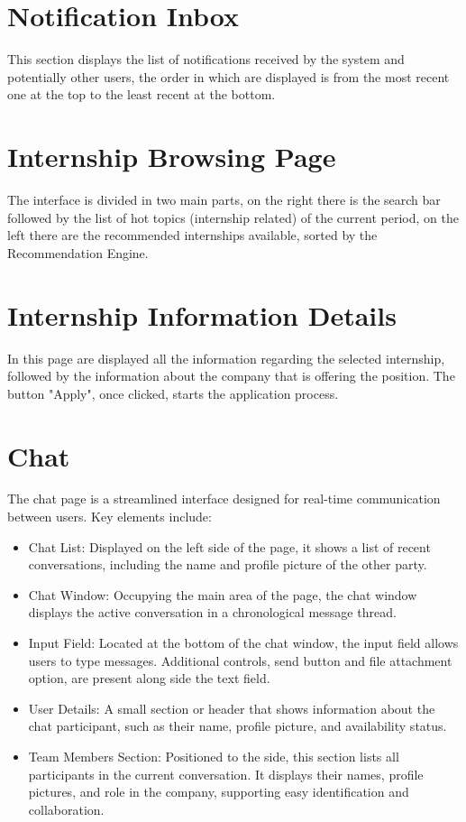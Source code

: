 \section{Notification Inbox}
This section displays the list of notifications received by the system and potentially other users, 
the order in which are displayed is from the most recent one at the top to the least recent at the bottom.

\section{Internship Browsing Page}
The interface is divided in two main parts, on the right there is the search bar followed by the list of 
hot topics (internship related) of the current period, on the left there are the recommended internships available, 
sorted by the Recommendation Engine.

\section{Internship Information Details}
In this page are displayed all the information regarding the selected internship, followed by the information 
about the company that is offering the position.
The button "Apply", once clicked, starts the application process.

\section{Chat}
The chat page is a streamlined interface designed for real-time communication between users. 
Key elements include:
\begin{itemize}
    \item Chat List: Displayed on the left side of the page, it shows a list of recent conversations, 
    including the name and profile picture of the other party.
    \item Chat Window: Occupying the main area of the page, 
    the chat window displays the active conversation in a chronological message thread. 
    \item Input Field: Located at the bottom of the chat window, the input field allows users to type messages. 
    Additional controls, send button and file attachment option, are present along side the text field.
    \item User Details: A small section or header that shows information about the chat participant, 
    such as their name, profile picture, and availability status.
    \item Team Members Section: Positioned to the side, this section lists all participants in the current conversation. 
    It displays their names, profile pictures, and role in the company, supporting easy identification and collaboration.
\end{itemize}


